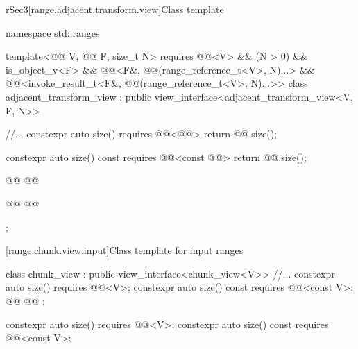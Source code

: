 \documentclass{wg21}
\begin{document}
rSec3[range.adjacent.transform.view]{Class template }

%
%
%
\begin{codeblock}
namespace std::ranges {
template<@@ V, @@ F, size_t N>
requires @@<V> && (N > 0) && is_object_v<F> &&
@@<F&, @@(range_reference_t<V>, N)...> &&
@@<invoke_result_t<F&, @@(range_reference_t<V>, N)...>>
class adjacent_transform_view : public view_interface<adjacent_transform_view<V, F, N>> {
    //...
    constexpr auto size() requires @@<@@> {
        return @@.size();
    }

    constexpr auto size() const requires @@<const @@> {
        return @@.size();
    }

    @@
    @@

    @@
    @@
};
}
\end{codeblock}

[range.chunk.view.input]{Class template  for input ranges}

%
%
%
\begin{codeblock}
class chunk_view : public view_interface<chunk_view<V>> {
    //...
    constexpr auto size() requires @@<V>;
    constexpr auto size() const requires @@<const V>;
    @@
    @@
};
\end{codeblock}

\begin{itemdecl}
    constexpr auto size() requires @@<V>;
    constexpr auto size() const requires @@<const V>;
\end{itemdecl}
\end{document}
